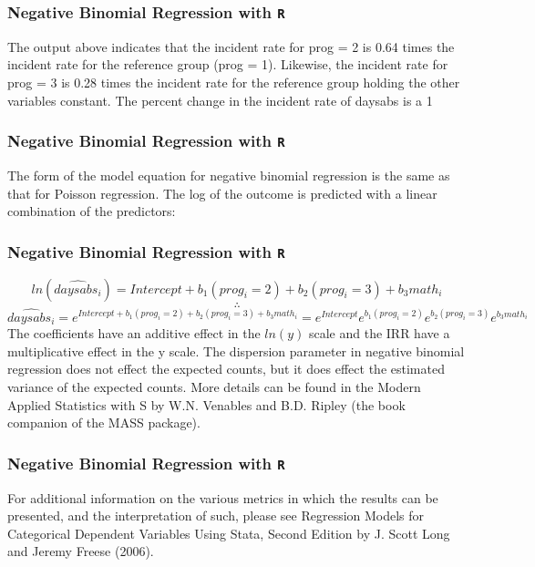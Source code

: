 \documentclass[00-GLMregslides.tex]{subfiles}
\begin{document}
\begin{frame}[fragile]
	\frametitle{Negative Binomial Regression with \texttt{R} }
	\Large
	
	The output above indicates that the incident rate for prog = 2 is 0.64 times the incident rate for the reference group (prog = 1). Likewise, the incident rate for prog = 3 is 0.28 times the incident rate for the reference group holding the other variables constant. The percent change in the incident rate of daysabs is a 1%
\end{frame}
\begin{frame}[fragile]
	\frametitle{Negative Binomial Regression with \texttt{R} }
	\Large
	
	The form of the model equation for negative binomial regression is the same as that for Poisson regression. The log of the outcome is predicted with a linear combination of the predictors:
\end{frame}
\begin{frame}[fragile]
	\frametitle{Negative Binomial Regression with \texttt{R} }
	\Large
	
	\[ ln(\widehat{daysabs_i}) = Intercept + b_1(prog_i = 2) + b_2(prog_i = 3) + b_3math_i \] \[ \therefore \] \[ \widehat{daysabs_i} = e^{Intercept + b_1(prog_i = 2) + b_2(prog_i = 3) + b_3math_i} = e^{Intercept}e^{b_1(prog_i = 2)}e^{b_2(prog_i = 3)}e^{b_3math_i} \]
	The coefficients have an additive effect in the \(ln(y)\) scale and the IRR have a multiplicative effect in the y scale. The dispersion parameter in negative binomial regression does not effect the expected counts, but it does effect the estimated variance of the expected counts. More details can be found in the Modern Applied Statistics with S by W.N. Venables and B.D. Ripley (the book companion of the MASS package).
\end{frame}
\begin{frame}[fragile]
	\frametitle{Negative Binomial Regression with \texttt{R} }
	\Large
	
	For additional information on the various metrics in which the results can be presented, and the interpretation of such, please see Regression Models for Categorical Dependent Variables Using Stata, Second Edition by J. Scott Long and Jeremy Freese (2006).
\end{frame}
\end{document}
